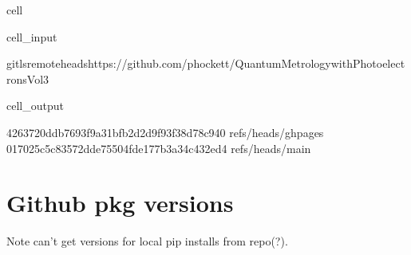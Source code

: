 \documentclass[letterpaper,table,10pt,english]{jupyterBook}
\begin{document}
\begin{sphinxuseclass}{cell}\begin{sphinxVerbatimInput}

\begin{sphinxuseclass}{cell_input}
\begin{sphinxVerbatim}[commandchars=\\\{\}]
gitls\PYGZhy{}remote\PYGZhy{}\PYGZhy{}headshttps://github.com/phockett/Quantum\PYGZhy{}Metrology\PYGZhy{}with\PYGZhy{}Photoelectrons\PYGZhy{}Vol3
\end{sphinxVerbatim}

\end{sphinxuseclass}\end{sphinxVerbatimInput}
\begin{sphinxVerbatimOutput}

\begin{sphinxuseclass}{cell_output}
\begin{sphinxVerbatim}[commandchars=\\\{\}]
4263720ddb7693f9a31bfb2d2d9f93f38d78c940	refs/heads/gh\PYGZhy{}pages
017025c5c83572dde75504fde177b3a34c432ed4	refs/heads/main
\end{sphinxVerbatim}

\end{sphinxuseclass}\end{sphinxVerbatimOutput}

\end{sphinxuseclass}

\section{Github pkg versions}
\label{\detokenize{tests/build_versions_checks:github-pkg-versions}}
\sphinxAtStartPar
Note \sphinxhyphen{} can’t get versions for local pip installs from repo(?).
\end{document}
